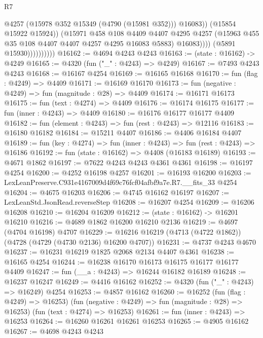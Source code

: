\begin{lexlean}{R7}
\begin{coremodule}
                                  @4257
                                  (@15978 @352 @15349 (@4790 (@15981 @352)))
                                  @16083))
                              (@15854 @15922 @15924))
                            (@15971
                              @458
                              @108
                              @4409
                              @4407
                              @4295
                              @4257
                              (@15963 @455 @35 @108 @4407 @4407 @4257 @4295 @16083 @5883)
                              @16083))))
                      (@5891 @15930))))))))))
@16162 := @4694 @4243 @4243
@16163 := (state : @16162) -> @4249
@16165 := @4320 (fun ("_" : @4243) => @4249)
@16167 := @7493 @4243 @4243
@16168 := @16167 @4254
@16169 := @16165 @16168
@16170 := fun (flag : @4249) => @4409
@16171 := @16169 @16170
@16173 := fun (negative : @4249) => fun (magnitude : @28) => @4409
@16174 := @16171 @16173
@16175 := fun (text : @4274) => @4409
@16176 := @16174 @16175
@16177 := fun (inner : @4243) => @4409
@16180 := @16176 @16177 @16177 @4409
@16182 := fun (element : @4243) => fun (rest : @4243) => @12116
@16183 := @16180 @16182
@16184 := @15211 @4407
@16186 := @4406 @16184 @4407
@16189 := fun (key : @4274) => fun (inner : @4243) => fun (rest : @4243) => @16186
@16192 := fun (state : @16162) => @4408 (@16183 @16189)
@16193 := @4671 @1862
@16197 := @7622 @4243 @4243 @4361 @4361
@16198 := @16197 @4254
@16200 := @4252 @16198 @4257
@16201 := @16193 @16200
@16203 := LexLeanPreserve.C931e4167009d4f69c76fcf04afbf9a7e.R7.__fits_33 @4254
@16204 := @4675 @16203
@16206 := @4745 @16162 @16197
@16207 := LexLeanStd.JsonRead.reverseStep
@16208 := @16207 @4254
@16209 := @16206 @16208
@16210 := @16204 @16209
@16212 := (state : @16162) -> @16201 @16210
@16216 := @4689 @1862 @16200 @16210 @2136
@16219 := @4697 (@4704 @16198) @4707
@16229 := @16216 @16219 (@4713 (@4722 @1862)) (@4728 (@4729 (@4730 @2136) @16200 @4707))
@16231 := @4737 @4243 @4670
@16237 := @16231 @16219 @1825 @2068 @2134 @4407 @4361
@16238 := @16165 @4254
@16244 := @16238 @16170 @16173 @16175 @16177 @16177 @4409
@16247 := fun (__a : @4243) => @16244 @16182 @16189
@16248 := @16237 @16247
@16249 := @4416 @16162
@16252 := @4320 (fun ("_" : @4243) => @16249) @4254
@16253 := @4857 @16162
@16260 := @16252
    (fun (flag : @4249) => @16253)
    (fun (negative : @4249) => fun (magnitude : @28) => @16253)
    (fun (text : @4274) => @16253)
@16261 := fun (inner : @4243) => @16253
@16264 := @16260 @16261 @16261 @16253
@16265 := @4905 @16162
@16267 := @4698 @4243 @4243

\end{coremodule}
\end{lexlean}
